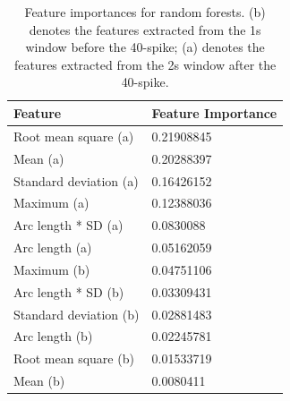 \begin{table}[t]
\centering
\begin{tabular}{@{}ll@{}}
\toprule
Feature                & Feature Importance \\ \midrule
Root mean square (a)   & 0.21908845         \\
Mean (a)               & 0.20288397         \\
Standard deviation (a) & 0.16426152         \\
Maximum (a)            & 0.12388036         \\
Arc length * SD (a)    & 0.0830088          \\
Arc length (a)         & 0.05162059         \\
Maximum (b)            & 0.04751106         \\
Arc length * SD (b)    & 0.03309431         \\
Standard deviation (b) & 0.02881483         \\
Arc length (b)         & 0.02245781         \\
Root mean square (b)   & 0.01533719         \\
Mean (b)               & 0.0080411          \\ \bottomrule
\end{tabular}
\caption{Feature importances for random forests. (b) denotes the features extracted from the 1s window before the 40-spike; (a) denotes the features extracted from the 2s window after the 40-spike.}
\label{tbl:importance-rf}
\end{table}




